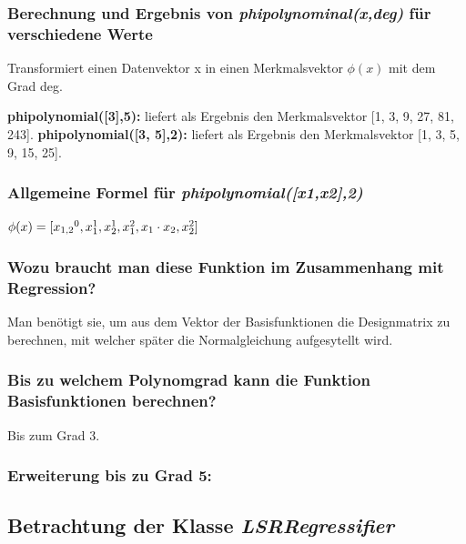 \subsubsection{ Berechnung und Ergebnis von \textit{phi\textunderscore polynominal(x,deg)} für verschiedene Werte}

Transformiert einen Datenvektor x in einen Merkmalsvektor $\phi (x)$ mit dem Grad deg. 

\noindent
\textbf{phi\textunderscore polynomial([3],5):} liefert als Ergebnis den Merkmalsvektor [1, 3, 9, 27, 81, 243].
\noindent
\textbf{phi\textunderscore polynomial([3, 5],2):} liefert als Ergebnis den Merkmalsvektor [1, 3, 5, 9, 15, 25].

\subsubsection{ Allgemeine Formel für \textit{phi\textunderscore polynomial([x1,x2],2)} }

\begin{center}
    $\phi (x) = [x\textsubscript{1,2}^0, x_1^1, x_2^1, x_1^2, x_1\cdot x_2, x_2^2]$
\end{center}

\subsubsection{ Wozu braucht man diese Funktion im Zusammenhang mit Regression? }

\noindent
 \vspace{0px}
Man benötigt sie, um aus dem Vektor der Basisfunktionen die Designmatrix zu berechnen, mit welcher später die Normalgleichung aufgesytellt wird. 

\subsubsection{ Bis zu welchem Polynomgrad kann die Funktion Basisfunktionen berechnen? }

\noindent
 \vspace{0px}
Bis zum Grad 3.

\subsubsection{ Erweiterung bis zu Grad 5: }

\subsection{
    Betrachtung der Klasse \textit{LSRRegressifier}
}

